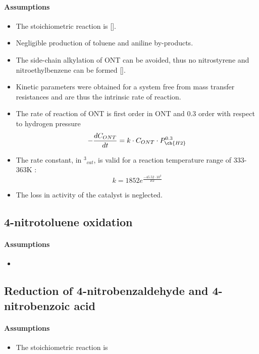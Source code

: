 \paragraph{Assumptions}
\begin{itemize}
    \item The stoichiometric reaction is  [].
    \item Negligible production of toluene and aniline by-products.  
    \item The side-chain alkylation of ONT can be avoided, thus no nitrostyrene and nitroethylbenzene can be formed [].
    \item Kinetic parameters were obtained for a system free from mass transfer resistances and are thus the intrinsic rate of reaction.
    \item The rate of reaction of ONT is first order in ONT and 0.3 order with respect to hydrogen pressure \cite{rajadhyaksha_solvent_1986}
    \begin{equation}
    - \frac{dC_{ONT}}{dt}=k \cdot C_{ONT} \cdot P_{\ch{H2}}^{0.3} 
    \end{equation}
    \item The rate constant, in \mol\per\kPa$^{3}$\g$_{cat}$\s, is valid for a reaction temperature range of 333-363K \cite{rajadhyaksha_solvent_1986}:
    \begin{equation}
        k=1852e^{\frac{-45.52\cdot 10^{3}}{RT}}
    \end{equation}
    \item The loss in activity of the catalyst is neglected.
\end{itemize}

\subsection{4-nitrotoluene oxidation}
\paragraph{Assumptions}
\begin{itemize}
    \item 
\end{itemize}

\subsection{Reduction of 4-nitrobenzaldehyde and 4-nitrobenzoic acid}
\paragraph{Assumptions}
\begin{itemize}
    \item The stoichiometric reaction is 
\end{itemize}
